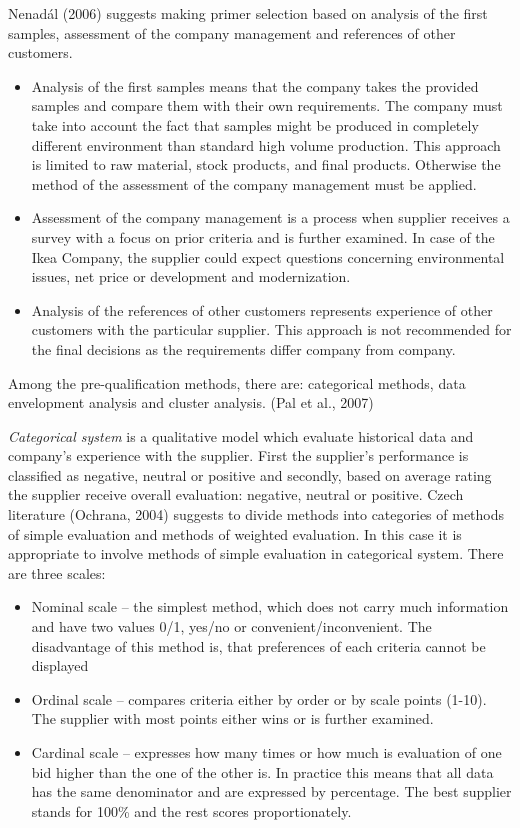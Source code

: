 \documentclass[oneside,12pt]{article}%
\begin{document}
Nenadál (2006) suggests making primer selection based on analysis of the first samples, assessment of the company management and references of other customers.
\begin{itemize}
  \item Analysis of the first samples means that the company takes the provided samples and compare them with their own requirements. The company must take into account the fact that samples might be produced in completely different environment than standard high volume production. This approach is limited to raw material, stock products, and final products. Otherwise the method of the assessment of the company management must be applied.
  \item Assessment of the company management is a process when supplier receives a survey with a focus on prior criteria and is further examined. In case of the Ikea Company, the supplier could expect questions concerning environmental issues, net price or development and modernization.
  \item Analysis of the references of other customers represents experience of other customers with the particular supplier. This approach is not recommended for the final decisions as the requirements differ company from company.

\end{itemize}


Among the pre-qualification methods, there are: categorical methods, data envelopment analysis and cluster analysis. (Pal et al., 2007) \par
\emph{Categorical system} is a qualitative model which evaluate historical data and company’s experience with the supplier. First the supplier’s performance is classified as negative, neutral or positive and secondly, based on average rating the supplier receive overall evaluation: negative, neutral or positive. Czech literature (Ochrana, 2004) suggests to divide methods into categories of methods of simple evaluation and methods of weighted evaluation. In this case it is appropriate to involve methods of simple evaluation in categorical system. There are three scales:
\begin{itemize}
\item Nominal scale – the simplest method, which does not carry much information and have two values 0/1, yes/no or convenient/inconvenient. The disadvantage of this method is, that preferences of each criteria cannot be displayed
\item Ordinal scale – compares criteria either by order or by scale points (1-10). The supplier with most points either wins or is further examined.
\item Cardinal scale – expresses how many times or how much is evaluation of one bid higher than the one of the other is. In practice this means that all data has the same denominator and are expressed by percentage. The best supplier stands for 100\% and the rest scores proportionately.
\end{itemize}
\end{document}
